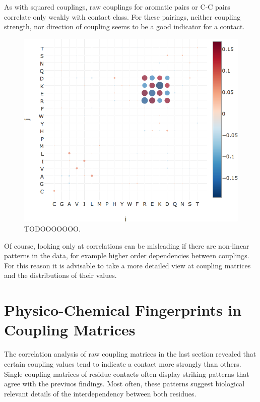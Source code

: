 \documentclass[12pt,a4paper,twoside]{book}
\theoremstyle{definition}
\theoremstyle{definition}
\theoremstyle{remark}
\begin{document}
As with squared couplings, raw couplings for aromatic pairs or C-C pairs
correlate only weakly with contact class. For these pairings, neither
coupling strength, nor direction of coupling seems to be a good
indicator for a contact.



\begin{figure}
\includegraphics[width=0.9\linewidth]{img/coupling_matrix_analysis/correlation_couplings_with_contact_class_notitle} \caption{TODOOOOOOO.}\label{fig:coupling-correlation}
\end{figure}

Of course, looking only at correlations can be misleading if there are
non-linear patterns in the data, for example higher order dependencies
between couplings. For this reason it is advisable to take a more
detailed view at coupling matrices and the distributions of their
values.

\section{Physico-Chemical Fingerprints in Coupling
Matrices}\label{physico-chemical-fingerprints-in-coupling-matrices}

The correlation analysis of raw coupling matrices in the last section
revealed that certain coupling values tend to indicate a contact more
strongly than others. Single coupling matrices of residue contacts often
display striking patterns that agree with the previuos findings. Most
often, these patterns suggest biological relevant details of the
interdependency between both residues.
\end{document}
